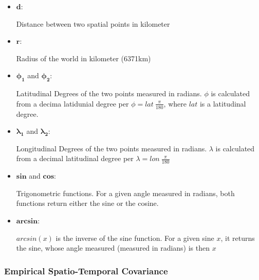 \documentclass[
  12pt,
]{article}
\begin{document}
\begin{itemize}[label={}]
  \item $\mathbf{d}$:\\
    \begin{adjustwidth}{1cm}{0cm}
      Distance between two spatial points in kilometer
    \end{adjustwidth}
  \item $\mathbf{r}$:\\
    \begin{adjustwidth}{1cm}{0cm}
      Radius of the world in kilometer (6371km)
    \end{adjustwidth}
  \item $\mathbf{\phi_1}$ and $\mathbf{\phi_2}$:\\
    \begin{adjustwidth}{1cm}{0cm}
      Latitudinal Degrees of the two points measured in radians. $\phi$ is calculated from a decima latidunial degree per $\phi=lat\:\frac{\pi}{180}$, where $lat$ is a latitudinal degree. 
    \end{adjustwidth}
  \item $\mathbf{\lambda_1}$ and $\mathbf{\lambda_2}$:\\
    \begin{adjustwidth}{1cm}{0cm}
      Longitudinal Degrees of the two points measured in radians. $\lambda$ is calculated from a decimal latitudinal degree per $\lambda=lon\:\frac{\pi}{180}$
    \end{adjustwidth}
  \item $\mathbf{sin}$ and $\mathbf{cos}$:\\
    \begin{adjustwidth}{1cm}{0cm}
    Trigonometric functions. For a given angle measured in radians, both functions return either the sine or the cosine. 
    \end{adjustwidth}
  \item $\mathbf{arcsin}$:\\
    \begin{adjustwidth}{1cm}{0cm}
    $arcsin(x)$ is the inverse of the sine function. For a given sine $x$, it returns the sine, whose angle measured (measured in radians) is then $x$
    \end{adjustwidth}
  
\end{itemize}

\clearpage

\hypertarget{empirical-spatio-temporal-covariance}{%
\subsubsection{Empirical Spatio-Temporal
Covariance}\label{empirical-spatio-temporal-covariance}}
\end{document}
